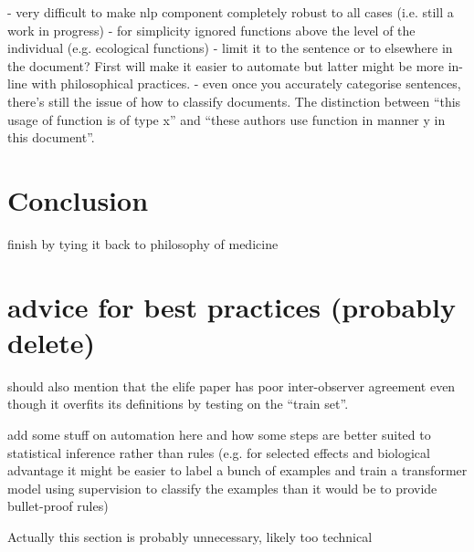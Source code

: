 \documentclass{article}
\begin{document}
- very difficult to make nlp component completely robust to all cases (i.e. still a work in progress)
- for simplicity ignored functions above the level of the individual (e.g. ecological functions)
- limit it to the sentence or to elsewhere in the document? First will make it easier to automate but latter might be more in-line with philosophical practices.
- even once you accurately categorise sentences, there's still the issue of how to classify documents. The distinction between ``this usage of function is of type x'' and ``these authors use function in manner y in this document''.

\section{Conclusion}
\label{sec:conclusion-1}

finish by tying it back to philosophy of medicine


\section{advice for best practices (probably delete)}
\label{sec:advice-best-pract}

should also mention that the elife paper has poor inter-observer agreement even though it overfits its definitions by testing on the ``train set''.

add some stuff on automation here and how some steps are better suited to statistical inference rather than rules (e.g. for selected effects and biological advantage it might be easier to label a bunch of examples and train a transformer model using supervision to classify the examples than it would be to provide bullet-proof rules)

Actually this section is probably unnecessary, likely too technical
\end{document}
